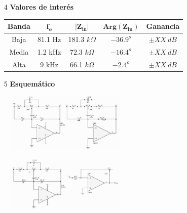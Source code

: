 \begin{multicols}{2}
\begin{enumerate}
	\item[4] \textbf{Valores de interés}
	\begin{table}[H]
		\begin{tabular}{ccccc}
			\hline			
			\textbf{Banda} & $\mathbf{f_o}$ & $\mathbf{|Z_{in}|}$ & $\mathbf{Arg\left(Z_{in}\right)}$ & \textbf{Ganancia} \\
			\hline
			Baja           & 81.1 Hz                     & 181.3 $k\Omega$     & $-36.9^o$                           & $\pm XX \ dB$          \\
			Media          & 1.2 kHz                     & 72.3 $k\Omega$      & $-16.4^o$                           & $\pm XX \ dB$          \\
			Alta           & 9 kHz                       & 66.1 $k\Omega$      & $-2.4^o$                            & $\pm XX \ dB$         	\\
			\hline
		\end{tabular}
	\end{table}

\end{enumerate}
\end{multicols}

\begin{enumerate}
	\item[5] \textbf{Esquemático}\\
\end{enumerate}

\begin{multicols}{2}
\centering
	\begin{figure}[H]
		\includegraphics[width=0.5\textwidth]{Imagenes/Schematic-1.png}
	\end{figure}
	\begin{figure}[H]
			\includegraphics[width=0.5\textwidth]{Imagenes/Schematic-2.png}
	\end{figure}
\end{multicols}

